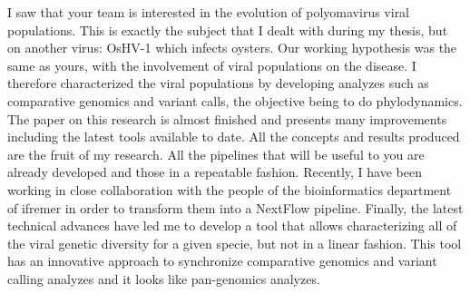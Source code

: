 \documentclass[11pt, a4paper]{awesome-cv}
\begin{document}
\begin{cvletter}
I saw that your team is interested in the evolution of polyomavirus viral populations. This is exactly the subject that I dealt with during my thesis, but on another virus: OsHV-1 which infects oysters. Our working hypothesis was the same as yours, with the involvement of viral populations on the disease. I therefore characterized the viral populations by developing analyzes such as comparative genomics and variant calls, the objective being to do phylodynamics. The paper on this research is almost finished and presents many improvements including the latest tools available to date. All the concepts and results produced are the fruit of my research. All the pipelines that will be useful to you are already developed and those in a repeatable fashion. Recently, I have been working in close collaboration with the people of the bioinformatics department of ifremer in order to transform them into a NextFlow pipeline. Finally, the latest technical advances have led me to develop a tool that allows characterizing all of the viral genetic diversity for a given specie, but not in a linear fashion. This tool has an innovative approach to synchronize comparative genomics and variant calling analyzes and it looks like pan-genomics analyzes.

\end{cvletter}


\makeletterclosing
\end{document}

